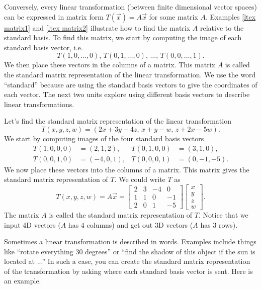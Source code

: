 Conversely, every linear transformation (between finite dimensional vector spaces) can be expressed in matrix form $T(\vec x)=A\vec x$ for some matrix $A$.  Examples \ref{ltex matrix1} and \ref{ltex matrix2} illustrate how to find the matrix $A$ relative to the standard basis.  To find this matrix, we start by computing the image of each standard basis vector, i.e. $$T(1,0,\ldots,0),\,T(0,1,\ldots,0),\, \ldots,\,T(0,0,\ldots,1).$$ We then place these vectors in the columns of a matrix.  This matrix $A$ is called the standard matrix representation of the linear transformation. We use the word ``standard'' because are using the standard basis vectors to give the coordinates of each vector.  The next two units explore using different basis vectors to describe linear transformations.

\begin{example} Let's find the standard matrix representation of the
  linear transformation $$T(x,y,z,w)=(2x+3y-4z,\,x+y-w,\,z+2x-5w).$$
  We start by computing images of the four standard basis vectors
  \begin{align*}
    T(1,0,0,0)&=(2,1,2), & T(0,1,0,0)&=(3,1,0),\\
    T(0,0,1,0)&=(-4,0,1), & T(0,0,0,1)&=(0,-1,-5).
  \end{align*}
We now place these vectors into the columns of a matrix.  This matrix gives the standard matrix representation of $T$.  We could write $T$ as
$$T(x,y,z,w)=A\vec x=
\begin{bmatrix}
2&3&-4&0\\
1&1&0 &-1\\
2&0&1 &-5
\end{bmatrix}
\begin{bmatrix}
x\\
y\\
z\\
w
\end{bmatrix}.$$ 
The matrix $A$ is called the standard matrix representation of $T$. 
% 
Notice that we input 4D vectors ($A$ has 4 columns) and get out 3D vectors ($A$ has 3 rows).  
\end{example}

Sometimes a linear transformation is described in words.  Examples include things like ``rotate everything 30 degrees'' or ``find the shadow of this object if the sun is located at ...''  In such a case, you can create the standard matrix representation of the transformation by asking where each standard basis vector is sent.  Here is an example.

